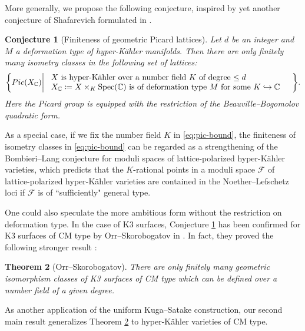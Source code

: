 \documentclass[11pt,reqno,oneside]{amsart}
\numberwithin{equation}{section}
\newtheorem{theorem}{Theorem}[section]
\newtheorem{conjecture}[theorem]{Conjecture}
\theoremstyle{definition}
\DeclareMathOperator{\Spec}{Spec}
\newcommand{\Pic}{{\rm Pic}}
\newcommand{\scF}{\mathscr{F}}
\newcommand{\CC}{\mathbb{C}}
\begin{document}
More generally, we propose the following conjecture, inspired by yet another conjecture of Shafarevich formulated in \cite{Shafarevich96}.

\begin{conjecture}[Finiteness of geometric Picard lattices]\label{conj:fin-ns}
Let $d$ be an integer and $M$ a deformation type of hyper-Kähler manifolds.  Then there are only finitely many isometry classes in the following set of lattices:
\begin{equation}\label{eq:pic-bound}
\bigg\{\Pic(X_\CC)\bigg |~ \begin{array}{lr}
	\hbox{\rm  $X$~is hyper-Kähler over a number field $K$ of  degree $\leq d$  } &  \\
	\hbox{\rm   $X_\CC\coloneqq X\times_K \Spec(\CC)$ is of deformation type $M$ for some $K\hookrightarrow \CC$} &
	\end{array}  \bigg \}.
\end{equation} 
Here the Picard group is equipped with the restriction of the Beauville--Bogomolov quadratic form.
\end{conjecture}

As a special case, if we fix the number field $K$ in \eqref{eq:pic-bound},  the finiteness of isometry classes in \eqref{eq:pic-bound} can be regarded as a strengthening of the Bombieri--Lang conjecture for moduli spaces of lattice-polarized hyper-Kähler varieties, which predicts that the $K$-rational points in a moduli space  $\scF$ of lattice-polarized hyper-Kähler varieties are contained in the Noether--Lefschetz loci if $\scF$ is of ``sufficiently" general type. 

One could also speculate the more ambitious form without the restriction on deformation type. In the case of K3 surfaces, Conjecture \ref{conj:fin-ns} has been confirmed for K3 surfaces of CM type by Orr--Skorobogatov in \cite[Corollary B.1]{OrrSkorobogatov}. In fact, they proved the following stronger result \cite[Theorem B]{OrrSkorobogatov}:

\begin{theorem}[Orr--Skorobogatov]\label{thm:OrrSkoro}
There are only finitely many geometric isomorphism classes of K3 surfaces of CM type which can be defined over a number field of a given degree. 
\end{theorem}


As another application of the uniform Kuga--Satake construction, our second main result generalizes Theorem \ref{thm:OrrSkoro} to hyper-Kähler varieties of CM type. 
\end{document}
